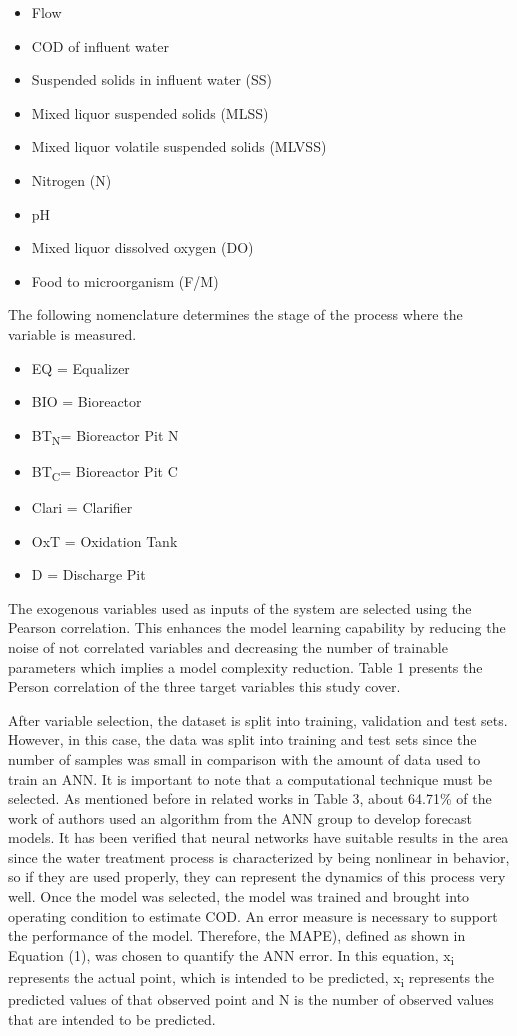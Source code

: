 \begin{itemize}
 \item	Flow
 \item	COD of influent water
 \item	Suspended solids in influent water (SS)
 \item	Mixed liquor suspended solids (MLSS)
 \item	Mixed liquor volatile suspended solids (MLVSS)
 \item	Nitrogen (N)
 \item	pH
 \item	Mixed liquor dissolved oxygen (DO)
 \item	Food to microorganism (F/M)
\end{itemize}

The following nomenclature determines the stage of the process where the variable is measured.

\begin{itemize}
 \item	EQ = Equalizer
 \item	BIO = Bioreactor
 \item	BT\textsubscript{N}= Bioreactor Pit N
 \item	BT\textsubscript{C}= Bioreactor Pit C
 \item	Clari = Clarifier
 \item	OxT = Oxidation Tank
 \item	D = Discharge Pit
\end{itemize}

The exogenous variables used as inputs of the system are selected using the Pearson correlation. This enhances the model learning capability by reducing the noise of not correlated variables and decreasing the number of trainable parameters which implies a model complexity reduction. Table 1 presents the Person correlation of the three target variables this study cover. 

After variable selection, the dataset is split into training, validation and test sets. However, in this case, the data was split into training and test sets since the number of samples was small in comparison with the amount of data used to train an ANN. It is important to note that a computational technique must be selected. As mentioned before in related works in Table 3, about 64.71\% of the work of authors used an algorithm from the ANN group to develop forecast models. It has been verified that neural networks have suitable results in the area since the water treatment process is characterized by being nonlinear in behavior, so if they are used properly, they can represent the dynamics of this process very well. Once the model was selected, the model was trained and brought into operating condition to estimate COD. An error measure is necessary to support the performance of the model. Therefore, the MAPE), defined as shown in Equation (1), was chosen to quantify the ANN error. In this equation, x\textsubscript{i} represents the actual point, which is intended to be predicted, x\textsubscript{i} represents the predicted values of that observed point and N is the number of observed values that are intended to be predicted.

